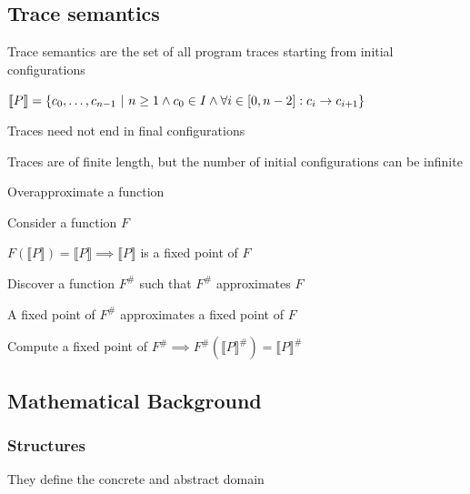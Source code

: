 \subsection{Trace semantics}
\enumstart
	\item Trace semantics are the set of all program traces starting from initial configurations
	\item $\llbracket P \rrbracket = \{c_0, \mathellipsis, c_{n - 1} \ | \ n \ge 1 \land c_0 \in I \land \forall i \in [0, n - 2]: c_i \rightarrow c_{i + 1}\}$
	\item Traces need not end in final configurations
	\item Traces are of finite length, but the number of initial configurations can be infinite
	\item Overapproximate a function
	\enumstart
		\item Consider a function $F$
		\item $F(\llbracket P \rrbracket) = \llbracket P \rrbracket \implies \llbracket P \rrbracket $ is a fixed point of $F$
		\item Discover a function $F^\#$ such that $F^\#$ approximates $F$
		\item A fixed point of $F^\#$ approximates a fixed point of $F$
		\item Compute a fixed point of $F^\# \implies F^\#(\llbracket P \rrbracket^\#) = \llbracket P \rrbracket^\#$
	\enumend
\enumend

\subsection{Mathematical Background}

\subsubsection{Structures}
\enumstart
	\item They define the concrete and abstract domain
\enumend

